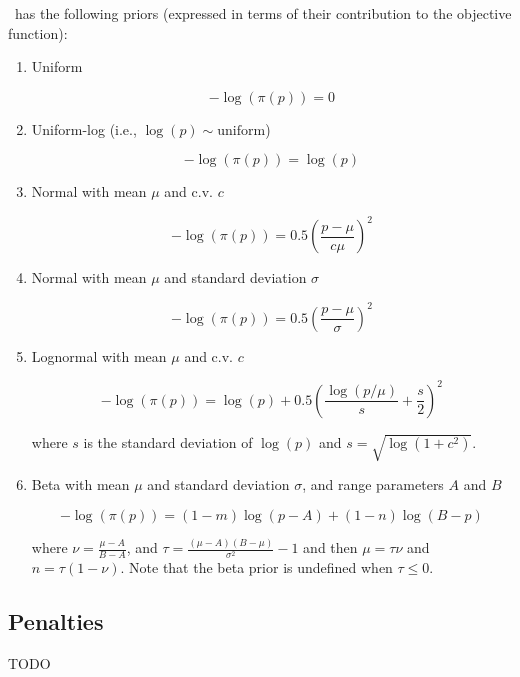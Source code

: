 \SPM\ has the following priors (expressed in terms of their contribution to the objective function): 

\begin{enumerate}
\item{Uniform}

\begin{equation}
 - \log \left(\pi \left(p \right) \right) = 0
\end{equation}

\item{Uniform-log} (i.e., $\log(p) \sim \text{uniform}$)

\begin{equation}
 - \log \left(\pi \left(p \right) \right) = \log \left( p \right)
\end{equation}

\item{Normal with mean $\mu$ and c.v. $c$}

\begin{equation}
 - \log \left(\pi \left(p \right) \right) = 0.5\left(\frac{p - \mu}{c\mu} \right)^2 
\end{equation}

\item{Normal with mean $\mu$ and standard deviation $\sigma$}

\begin{equation}
 - \log \left(\pi \left(p \right) \right) = 0.5\left(\frac{p - \mu}
{\sigma }\right)^2
\end{equation}

\item{Lognormal with mean $\mu$ and c.v. $c$} 

\begin{equation}
 - \log \left(\pi \left(p \right) \right) = \log \left( p \right) + 0.5 \left( \frac{\log \left( p / \mu \right)}{s} + \frac{s}{2} \right)^2
\end{equation}

where $s$ is the standard deviation of $\log(p)$ and $s= \sqrt{\log \left(1+c^2 \right)}$.

\item{Beta with mean $\mu$ and standard deviation $\sigma$, and range parameters $A$ and $B$}

\begin{equation}
 - \log \left(\pi \left( p \right) \right) = \left( 1 - m \right) \log \left( p - A \right) + \left( 1 - n \right)\log \left( B - p \right)
\end{equation}

where $\nu  = \frac{\mu  - A}{B - A}$, and $\tau = \frac{\left(\mu -A \right)\left(B - \mu \right)}{\sigma ^2} - 1$ and then $\mu=\tau \nu$ and $n=\tau(1-\nu)$. Note that the beta prior is undefined when $\tau \leq 0$.

\end{enumerate}

\subsection{Penalties\label{sec:penalties}}

TODO
